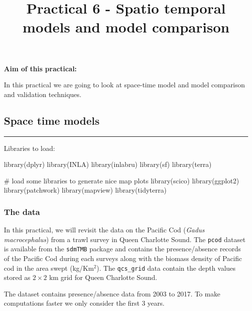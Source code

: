 \documentclass[
  letterpaper,
  DIV=11,
  numbers=noendperiod]{scrartcl}
\title{Practical 6 - Spatio temporal models and model comparison}
\author{}
\date{}
\makeatletter
\newenvironment{Shaded}{\begin{snugshade}}{\end{snugshade}}
\newcommand{\CommentTok}[1]{\textcolor[rgb]{0.37,0.37,0.37}{#1}}
\newcommand{\FunctionTok}[1]{\textcolor[rgb]{0.28,0.35,0.67}{#1}}
\newcommand{\NormalTok}[1]{\textcolor[rgb]{0.00,0.23,0.31}{#1}}
\renewcommand{\maketitle}{\bgroup\setlength{\parindent}{0pt}
\begin{flushleft}
  {\sffamily\huge\textbf{\MakeUppercase{\@title}}} \vspace{0.3cm} \newline
  {\Large {\@subtitle}} \newline
  \@author
\end{flushleft}\egroup
}
\makeatother
\begin{document}
\maketitle

\pagestyle{mystyle}


\textbf{Aim of this practical:}

In this practical we are going to look at space-time model and model
comparison and validation techniques.

\subsection{Space time models}\label{space-time-models}

\begin{center}\rule{0.5\linewidth}{0.5pt}\end{center}

Libraries to load:

\begin{Shaded}
\begin{Highlighting}[]
\FunctionTok{library}\NormalTok{(dplyr)}
\FunctionTok{library}\NormalTok{(INLA)}
\FunctionTok{library}\NormalTok{(inlabru) }
\FunctionTok{library}\NormalTok{(sf)}
\FunctionTok{library}\NormalTok{(terra)}


\CommentTok{\# load some libraries to generate nice map plots}
\FunctionTok{library}\NormalTok{(scico)}
\FunctionTok{library}\NormalTok{(ggplot2)}
\FunctionTok{library}\NormalTok{(patchwork)}
\FunctionTok{library}\NormalTok{(mapview)}
\FunctionTok{library}\NormalTok{(tidyterra)}
\end{Highlighting}
\end{Shaded}

\subsubsection{The data}\label{the-data}

In this practical, we will revisit the data on the Pacific Cod
(\emph{Gadus macrocephalus}) from a trawl survey in Queen Charlotte
Sound. The \texttt{pcod} dataset is available from the \texttt{sdmTMB}
package and contains the presence/absence records of the Pacific Cod
during each surveys along with the biomass density of Pacific cod in the
area swept (kg/Km\(^2\)). The \texttt{qcs\_grid} data contain the depth
values stored as \(2\times 2\) km grid for Queen Charlotte Sound.

The dataset contains presence/absence data from 2003 to 2017. To make
computations faster we only consider the first 3 years.
\end{document}
